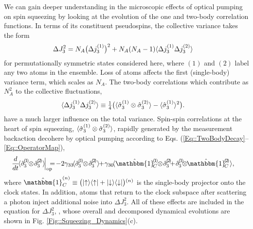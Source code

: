\documentclass[aps,pra,twocolumn]{revtex4-1} %
\newcommand{\varz}{\Delta J_3^2}
\begin{document}
We can gain deeper understanding in the microscopic effects of optical pumping on spin squeezing by looking at the evolution of the one and two-body correlation functions.  In terms of its constituent pseudospins, the collective variance takes the form
	\begin{align} \label{Eq::VarianceDecomposition}
	\varz & = N_A \big( \Delta j_3^{(1)} \big)^2 + N_A(N_A-1) \expt{ \Delta j_3^{(1)} \Delta j_3^{(2)} }
	\end{align}
for permutationally symmetric states considered here, where $(1)$ and $(2)$ label any two atoms in the ensemble. Loss of atoms affects the first (single-body) variance term, which scales as $N_A$.
The two-body correlations which contribute as $N_A^2$ to the collective fluctuations, 
	\begin{align}
		\langle{ \Delta j_3^{(1)} \Delta j_3^{(2)} }\rangle &\equiv \mbox{$\frac{1}{4}$} \big( \langle{ \hat{\sigma}_3^{(1)} \otimes \hat{\sigma}_3^{(2)}  }\rangle - \langle{\hat{\sigma}_3^{(1)} }\rangle^2  \big).
\end{align}
have a much larger influence on the total variance. Spin-spin correlations at the heart of spin squeezing, $\langle{ \hat{\sigma}_3^{(1)} \otimes \hat{\sigma}_3^{(2)} }\rangle$, rapidly generated by the measurement backaction decohere by optical pumping according to Eqs. (\ref{Eq::TwoBodyDecay}--\ref{Eq::OperatorMap}),
	\begin{align} \label{Eq::TwoBodySpinDecay}
		\!\!\!\!\!\!\frac{d}{dt}\! \expt{\hat{\sigma}\!_3^{(\!1\!)}\!\! \otimes\! \hat{\sigma}\!_3^{(\!2\!)} }  \!\Big|_{\rm op}\!\!\!\! =\! - 2 \gamma_{33} \! \expt{\hat{\sigma}\!_3^{(\!1\!)} \!\!\otimes\! \hat{\sigma}\!_3^{(\!2\!)} } \!\!+\! \gamma_{30}\! \expt{ \hat{\mathbbm{1}}\!^{(\!1\!)}_C \!\!\otimes\! \hat{\sigma}\!_3^{(\!2\!)\!} \!\!+\! \hat{\sigma}\!_3^{(\!1\!)} \!\!\!\otimes\!\! \hat{\mathbbm{1}}\!^{(\!2\!)}_C },
	\end{align}
where $\hat{\mathbbm{1}}^{(n)}_C \equiv \big( \op{\uparrow}{\uparrow} + \op{\downarrow}{\downarrow} \big){}^{(n)}$ is the single-body projector onto the clock states.   
In addition, atoms that return to the clock subspace after scattering a photon inject additional noise into $\varz$.  
All of these effects are included in the equation for $\varz$, , whose overall and decomposed dynamical evolutions are shown in Fig. \ref{Fig::Squeezing_Dynamics}(c). 
\end{document}
